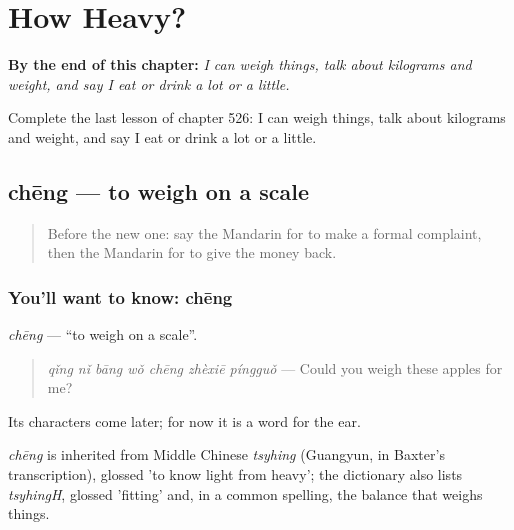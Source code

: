 
\chapter{How Heavy?}
\label{ch:zh-how-heavy}

\begin{chapteropening}
\textbf{By the end of this chapter:} \emph{I can weigh things, talk about kilograms and weight, and say I eat or drink a lot or a little.}

Complete the last lesson of chapter 526: I can weigh things, talk about kilograms and weight, and say I eat or drink a lot or a little.
\end{chapteropening}

\section[chēng]{chēng — to weigh on a scale}

\label{lesson:ZH-C526-cheng-weigh}



\begin{quote}
Before the new one: say the Mandarin for to make a formal complaint, then the Mandarin for to give the money back.
\end{quote}

\subsection*{You'll want to know: chēng}
\emph{chēng} — \textquotedblleft{}to weigh on a scale\textquotedblright{}.

\begin{quote}
\emph{qǐng nǐ bāng wǒ chēng zhèxiē píngguǒ} — Could you weigh these apples for me?
\end{quote}

Its characters come later; for now it is a word for the ear.

\begin{cousinweb}
\emph{chēng} is inherited from Middle Chinese \emph{tsyhing} (Guangyun, in Baxter's transcription), glossed 'to know light from heavy'; the dictionary also lists \emph{tsyhingH}, glossed 'fitting' and, in a common spelling, the balance that weighs things.
\end{cousinweb}


